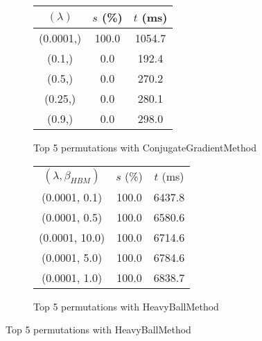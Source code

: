 \begin{figure}[H]
{\begin{subfigure}[ht]{.6\textwidth}
\begin{tabular}{|c|c|c|}
$(\lambda)$ & $s$ (\%) & $t$ (ms) \\
\hline
(0.0001,) & 100.0 & 1054.7 \\
(0.1,) & 0.0 & 192.4 \\
(0.5,) & 0.0 & 270.2 \\
(0.25,) & 0.0 & 280.1 \\
(0.9,) & 0.0 & 298.0 \\
\hline
\end{tabular}
\caption{Top 5 permutations with ConjugateGradientMethod}
\label{subfig:param_comp_MatrixSquareSum_ConjugateGradientMethod_ConstantSearch}
\end{subfigure}
\hfill
\begin{subfigure}[ht]{.6\textwidth}
\centering
{}
\begin{tabular}{|c|c|c|}
\hline
\rowcolor{gray!25}
\multicolumn{3}{|c|}{HeavyBallMethod} \\
\hline
\rowcolor{gray!25}
$(\lambda,\beta_{HBM})$ & $s$ (\%) & $t$ (ms) \\
\hline
(0.0001, 0.1) & 100.0 & 6437.8 \\
(0.0001, 0.5) & 100.0 & 6580.6 \\
(0.0001, 10.0) & 100.0 & 6714.6 \\
(0.0001, 5.0) & 100.0 & 6784.6 \\
(0.0001, 1.0) & 100.0 & 6838.7 \\
\hline
\end{tabular}
\caption{Top 5 permutations with HeavyBallMethod}
\label{subfig:param_comp_MatrixSquareSum_HeavyBallMethod_ConstantSearch}
\end{subfigure}
}
\end{figure}

